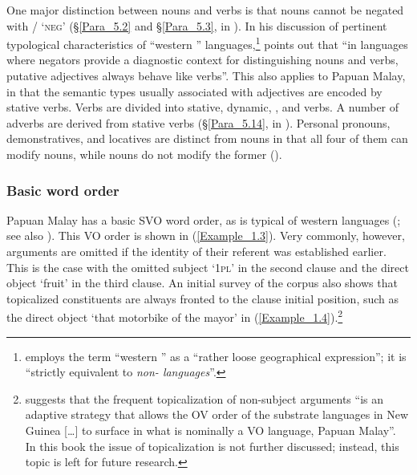 One major distinction between nouns and verbs is that nouns cannot be negated with / ‘\textsc{neg}’ (§\ref{Para_5.2} and §\ref{Para_5.3}, in ). In his discussion of pertinent typological characteristics of  ``western '' languages,\footnote{\citet[111]{Himmelmann.2005} employs the term  ``western '' as a  ``rather loose geographical expression''; it is  ``strictly equivalent to \textit{non-  languages}''.} \citet[128]{Himmelmann.2005} points out that  ``in languages where negators provide a diagnostic context for distinguishing nouns and verbs, putative adjectives always behave like verbs''. This also applies to Papuan Malay, in that the semantic types usually associated with adjectives are encoded by  stative verbs. Verbs are divided into  stative,  dynamic, , and  verbs. A number of adverbs are derived from  stative verbs (§\ref{Para_5.14}, in ). Personal pronouns, demonstratives, and locatives are distinct from nouns in that all four of them can modify nouns, while nouns do not modify the former ().


\subsubsection[Basic word order]{Basic word order}\label{Para_1.6.1.4}
Papuan Malay has a basic SVO word order, as is typical of western  languages (\citealt[141–144]{Himmelmann.2005}; see also \citealt[355–359]{Donohue.2007c}). This VO order is shown in (\ref{Example_1.3}). Very commonly, however, arguments are omitted if the identity of their referent was established earlier. This is the case with the omitted subject  ‘\textsc{1pl}’ in the second clause and the direct object  ‘fruit’ in the third clause. An initial survey of the corpus also shows that topicalized constituents are always fronted to the clause initial position, such as the direct object  ‘that motorbike of the mayor’ in (\ref{Example_1.4}).\footnote{{\citet[433]{Donohue.2011}} suggests that the frequent topicalization of non-subject arguments  ``is an adaptive strategy that allows the OV order of the substrate languages in New Guinea [\ldots] to surface in what is nominally a VO language, Papuan Malay''.\\
In this book the issue of topicalization is not further discussed; instead, this topic is left for future research.}


